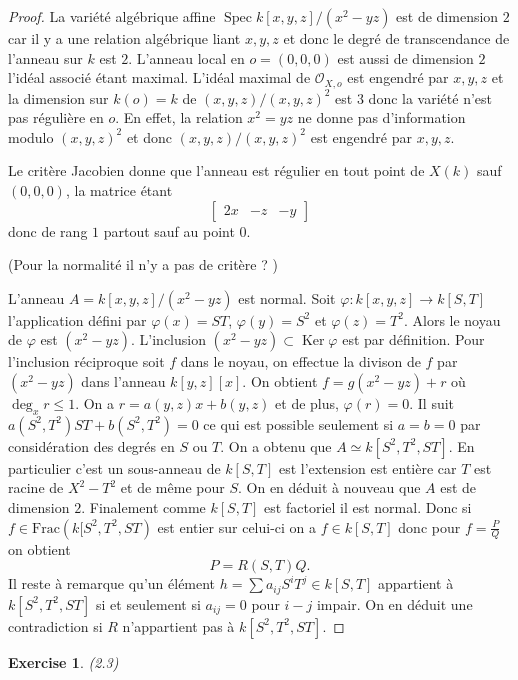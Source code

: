\documentclass[A4, 11pt]{article}
\newtheorem{exer}{Exercise}
\def\Ker{  \operatorname{Ker} }
\def\Spec{ \operatorname{Spec}}
\begin{document}
\begin{proof}
La variété algébrique affine $\Spec k[x,y,z]/(x^2-yz)$ est de dimension $2$ car il y a une relation algébrique liant $x,y,z$ et donc le degré de transcendance de l'anneau sur $k$ est $2$. L'anneau local en $o=(0,0,0)$ est aussi de dimension $2$ l'idéal associé étant maximal. L'idéal maximal de $\mathcal{O}_{X,o}$ est engendré par $x,y,z$ et la dimension sur $k(o)=k$ de $(x,y,z)/(x,y,z)^2$ est $3$ donc la variété n'est pas régulière en $o$. En effet, la relation $x^2=yz$ ne donne pas d'information modulo $(x,y,z)^2$ et donc $(x,y,z)/(x,y,z)^2$ est engendré par $x,y,z$. 

Le critère Jacobien donne que l'anneau est régulier en tout point de $X(k)$ sauf $(0,0,0)$, la matrice étant
$$\begin{bmatrix}
2x & -z & -y
\end{bmatrix}$$
donc de rang $1$ partout sauf au point $0$. 

(Pour la normalité il n'y a pas de critère ? )

L'anneau $A=k[x,y,z]/(x^2-yz)$ est normal. Soit $\varphi\colon k[x,y,z]\rightarrow k[S,T]$ l'application défini par $\varphi(x)=ST$, $\varphi(y)=S^2$ et $\varphi(z)=T^2$. Alors le noyau de $\varphi$ est $(x^2-yz)$. L'inclusion $(x^2-yz)\subset \Ker \varphi$ est par définition. Pour l'inclusion réciproque soit $f$ dans le noyau, on effectue la divison de $f$ par $(x^2-yz)$ dans l'anneau $k[y,z][x]$. On obtient $f=g(x^2-yz)+r$ où $\deg_x r \leq 1$. On a $r=a(y,z)x+b(y,z)$ et de plus, $\varphi(r)=0$. Il suit $a(S^2,T^2)ST+b(S^2,T^2)=0$ ce qui est possible seulement si $a=b=0$ par considération des degrés en $S$ ou $T$. On a obtenu que $A\simeq k[S^2,T^2,ST]$. En particulier c'est un sous-anneau de $k[S,T]$ est l'extension est entière car $T$ est racine de $X^2-T^2$ et de même pour $S$. On en déduit à nouveau que $A$ est de dimension $2$. Finalement comme $k[S,T]$ est factoriel il est normal. Donc si $f\in \mathrm{Frac}(k[S^2,T^2,ST)$ est entier sur celui-ci on a $f\in k[S,T]$ donc pour $f=\frac{P}{Q}$ on obtient
$$P=R(S,T)Q.$$
Il reste à remarque qu'un élément $h=\sum a_{ij}S^iT^j\in k[S,T]$ appartient à $k[S^2,T^2,ST]$ si et seulement si $a_{ij}=0$ pour $i-j$ impair. On en déduit une contradiction si $R$ n'appartient pas à $k[S^2,T^2,ST]$.
\end{proof}
\begin{exer}(2.3)
\end{exer}
\end{document}
